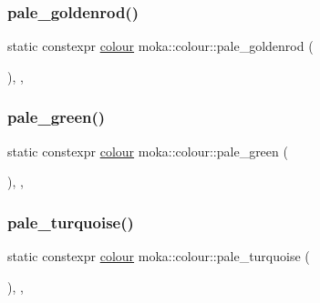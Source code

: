 \mbox{\label{classmoka_1_1colour_a258f63765e7938cef739980ffca65a8b}} 
\subsubsection{\texorpdfstring{pale\_goldenrod()}{pale\_goldenrod()}}
{\footnotesize\ttfamily static constexpr \mbox{\hyperlink{classmoka_1_1colour}{colour}} moka\+::colour\+::pale\+\_\+goldenrod (\begin{DoxyParamCaption}{ }\end{DoxyParamCaption})\hspace{0.3cm}{\ttfamily [inline]}, {\ttfamily [static]}, {\ttfamily [noexcept]}}

\mbox{\label{classmoka_1_1colour_a7945c8658d3ea970de965adb1e1bdc4b}} 
\subsubsection{\texorpdfstring{pale\_green()}{pale\_green()}}
{\footnotesize\ttfamily static constexpr \mbox{\hyperlink{classmoka_1_1colour}{colour}} moka\+::colour\+::pale\+\_\+green (\begin{DoxyParamCaption}{ }\end{DoxyParamCaption})\hspace{0.3cm}{\ttfamily [inline]}, {\ttfamily [static]}, {\ttfamily [noexcept]}}

\mbox{\label{classmoka_1_1colour_a17f2b2cbdbf81c008b0ce8749938adb4}} 
\subsubsection{\texorpdfstring{pale\_turquoise()}{pale\_turquoise()}}
{\footnotesize\ttfamily static constexpr \mbox{\hyperlink{classmoka_1_1colour}{colour}} moka\+::colour\+::pale\+\_\+turquoise (\begin{DoxyParamCaption}{ }\end{DoxyParamCaption})\hspace{0.3cm}{\ttfamily [inline]}, {\ttfamily [static]}, {\ttfamily [noexcept]}}

